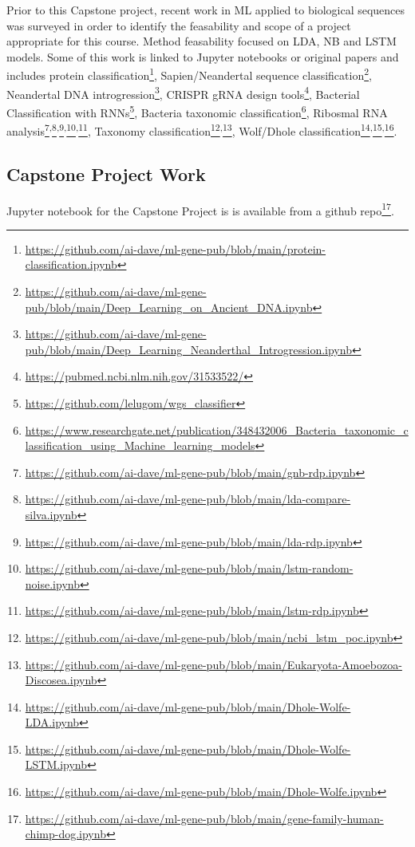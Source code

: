 Prior to this Capstone project, recent work in ML applied to biological sequences was surveyed in order to identify the feasability and scope of a project appropriate for this course.  Method feasability focused on LDA, NB and LSTM models. Some of this work is linked to Jupyter notebooks or original papers and includes protein classification\footnote{\url{https://github.com/ai-dave/ml-gene-pub/blob/main/protein-classification.ipynb}},
Sapien/Neandertal sequence classification\footnote{\url{https://github.com/ai-dave/ml-gene-pub/blob/main/Deep_Learning_on_Ancient_DNA.ipynb}},
Neandertal DNA introgression\footnote{\url{https://github.com/ai-dave/ml-gene-pub/blob/main/Deep_Learning_Neanderthal_Introgression.ipynb}}, 
CRISPR gRNA design tools\footnote{\url{https://pubmed.ncbi.nlm.nih.gov/31533522/}},
Bacterial Classification with RNNs\footnote{\url{https://github.com/lelugom/wgs_classifier}}, 
Bacteria taxonomic classification\footnote{\url{https://www.researchgate.net/publication/348432006_Bacteria_taxonomic_classification_using_Machine_learning_models}},
Ribosmal RNA analysis\footnote{\url{https://github.com/ai-dave/ml-gene-pub/blob/main/gnb-rdp.ipynb}}\textsuperscript{,}\footnote{\url{https://github.com/ai-dave/ml-gene-pub/blob/main/lda-compare-silva.ipynb}}\textsuperscript{,}\footnote{\url{https://github.com/ai-dave/ml-gene-pub/blob/main/lda-rdp.ipynb}}\textsuperscript{,}\footnote{\url{https://github.com/ai-dave/ml-gene-pub/blob/main/lstm-random-noise.ipynb}}\textsuperscript{,}\footnote{\url{https://github.com/ai-dave/ml-gene-pub/blob/main/lstm-rdp.ipynb}},
Taxonomy classification\footnote{\url{https://github.com/ai-dave/ml-gene-pub/blob/main/ncbi_lstm_poc.ipynb}}\textsuperscript{,}\footnote{\url{https://github.com/ai-dave/ml-gene-pub/blob/main/Eukaryota-Amoebozoa-Discosea.ipynb}},
Wolf/Dhole classification\footnote{\url{https://github.com/ai-dave/ml-gene-pub/blob/main/Dhole-Wolfe-LDA.ipynb}}\textsuperscript{,}\footnote{\url{https://github.com/ai-dave/ml-gene-pub/blob/main/Dhole-Wolfe-LSTM.ipynb}}\textsuperscript{,}\footnote{\url{https://github.com/ai-dave/ml-gene-pub/blob/main/Dhole-Wolfe.ipynb}}.

\subsection{Capstone Project Work}
Jupyter notebook for the Capstone Project is is available from a github repo\footnote{\url{https://github.com/ai-dave/ml-gene-pub/blob/main/gene-family-human-chimp-dog.ipynb}}.